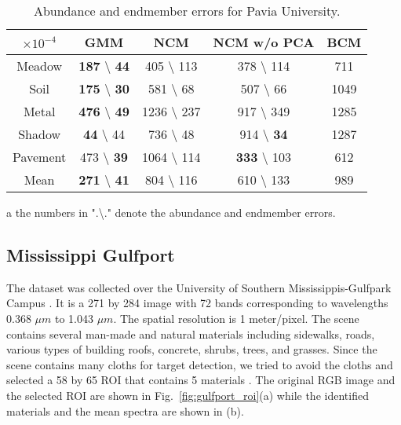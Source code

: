 \documentclass[twocolumn,english]{IEEEtran}
\providecommand{\tabularnewline}{\\}
\theoremstyle{plain}
\begin{document}
\begin{table}
\centering\caption{Abundance and endmember errors for Pavia University.}

\begin{threeparttable}
\begin{centering}
\begin{tabular}{|c|c|c|c|c|}
\hline 
$\times10^{-4}$ &
GMM &
NCM &
NCM w/o PCA &
BCM\tabularnewline
\hline 
\hline 
Meadow &
\textbf{187} \textbackslash{} \textbf{44}\tnote{a} &
405 \textbackslash{} 113 &
378 \textbackslash{} 114 &
711\tabularnewline
\hline 
Soil &
\textbf{175} \textbackslash{} \textbf{30} &
581 \textbackslash{} 68 &
507 \textbackslash{} 66 &
1049\tabularnewline
\hline 
Metal &
\textbf{476} \textbackslash{} \textbf{49} &
1236 \textbackslash{} 237 &
917 \textbackslash{} 349 &
1285\tabularnewline
\hline 
Shadow &
\textbf{44} \textbackslash{} 44 &
736 \textbackslash{} 48 &
914 \textbackslash{} \textbf{34} &
1287\tabularnewline
\hline 
Pavement &
473 \textbackslash{} \textbf{39} &
1064 \textbackslash{} 114 &
\textbf{333} \textbackslash{} 103 &
612\tabularnewline
\hline 
Mean &
\textbf{271} \textbackslash{} \textbf{41} &
804 \textbackslash{} 116 &
610 \textbackslash{} 133 &
989\tabularnewline
\hline 
\end{tabular}
\par\end{centering}
\label{table:pavia_abundances_error}

\begin{tablenotes} \item [a] the numbers in ".\textbackslash." denote the abundance and endmember errors. \end{tablenotes} \end{threeparttable}
\end{table}


\subsection{Mississippi Gulfport }

The dataset was collected over the University of Southern Mississippis-Gulfpark
Campus \cite{gader2013muufl}. It is a 271 by 284 image with 72 bands
corresponding to wavelengths 0.368 $\mu m$ to 1.043 $\mu m$. The
spatial resolution is 1 meter/pixel. The scene contains several man-made
and natural materials including sidewalks, roads, various types of
building roofs, concrete, shrubs, trees, and grasses. Since the scene
contains many cloths for target detection, we tried to avoid the cloths
and selected a 58 by 65 ROI that contains 5 materials \cite{Du2017sceneLabel}.
The original RGB image and the selected ROI are shown in Fig.~\ref{fig:gulfport_roi}(a)
while the identified materials and the mean spectra are shown in (b).
\end{document}
